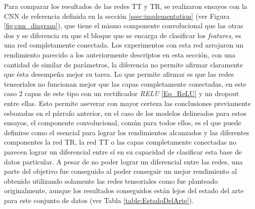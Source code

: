 \documentclass[spanish]{article}
\theoremstyle{definition}
\theoremstyle{remark}
\numberwithin{equation}{section}
\numberwithin{equation}{section} %
\begin{document}
Para comparar los resultados de las redes TT y TR, se realizaron ensayos con la CNN de referencia definida en la sección \ref{ssec:implementation} (ver Figura \ref{fig:cnn_diagram}), que tiene el mismo componente convolucional que las otras dos y se diferencia en que el bloque que se encarga de clasificar los \textit{features}, es una red completamente conectada. Los experimentos con esta red arrojaron un rendimiento parecido a los anteriormente descriptos en esta sección, con una cantidad de similar de parámetros, la diferencia no permite afirmar claramente que ésta desempeña mejor su tarea. Lo que permite afirmar es que las redes tensoriales no funcionan mejor que las capas completamente conectadas, en este caso 2 capas de este tipo con un rectificador \textit{RELU} \eqref{Eq_ReLU} y un dropout entre ellas. Esto permite aseverar con mayor certeza las conclusiones previamente esbozadas en el párrafo anterior, en el caso de los modelos delineados para estos ensayos, el componente convolucional, común para todos ellos, es el que puede definirse como el esencial para lograr los rendimientos alcanzados y las diferentes componentes la red TR, la red TT o las capas completamente conectadas no parecen lograr un diferencial entre sí en su capacidad de clasificar esta base de datos particular. A pesar de no poder lograr un diferencial entre las redes, una parte del objetivo fue conseguido al poder conseguir un mejor rendimiento al obtenido utilizando solamente las redes tensoriales como fue planteado originalmente, aunque los resultados conseguidos están lejos del estado del arte para este conjunto de datos (ver Tabla \ref{table:EstadoDelArte}).    
\par
\end{document}
